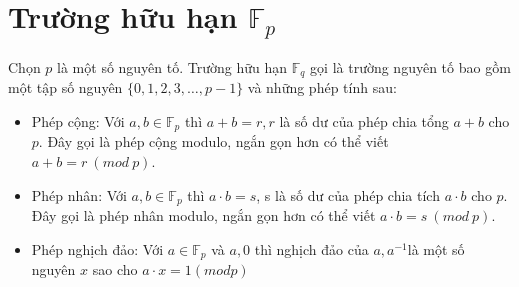 \documentclass[a4paper,12pt]{report}
\begin{document}
\section{Trường hữu hạn $\mathbb{F}_p$}
Chọn $p$ là một số nguyên tố. Trường hữu hạn $\mathbb{F}_q$ gọi là trường nguyên tố bao gồm một tập số nguyên $\{0, 1, 2, 3, \ldots , p - 1\}$ và những phép tính sau:
\begin{itemize}
\item Phép cộng: Với $a, b \in \mathbb{F}_p$ thì $a + b = r, r$ là số dư của phép chia tổng $a + b$ cho $p$. Đây gọi là phép cộng modulo, ngắn gọn hơn có thể viết $a + b = r \ (mod \ p)$.
\item Phép nhân: Với $a, b \in \mathbb{F}_p$ thì $a \cdot b = s$, s là số dư của phép chia tích $a \cdot b$ cho $p$. Đây gọi là phép nhân modulo, ngắn gọn hơn có thể viết $a \cdot b = s \ (mod \ p)$.
\item Phép nghịch đảo: Với $a \in \mathbb{F}_p$ và $a , 0$ thì nghịch đảo của $a, a^{-1}$là một số nguyên $x$ sao cho $a \cdot x = 1 (mod p)$
\end{itemize}
\end{document}
